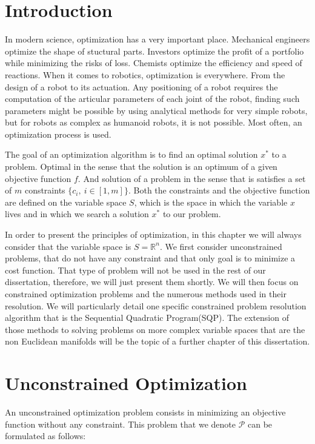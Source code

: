 \section{Introduction}
In modern science, optimization has a very important place.
Mechanical engineers optimize the shape of stuctural parts.
Investors optimize the profit of a portfolio while minimizing the risks of loss.
Chemists optimize the efficiency and speed of reactions.
When it comes to robotics, optimization is everywhere.
From the design of a robot to its actuation.
Any positioning of a robot requires the computation of the articular parameters of each joint of the robot, finding such parameters might be possible by using analytical methods for very simple robots, but for robots as complex as humanoid robots, it is not possible.
Most often, an optimization process is used.

The goal of an optimization algorithm is to find an optimal solution $x^*$ to a problem.
Optimal in the sense that the solution is an optimum of a given objective function $f$.
And solution of a problem in the sense that is satisfies a set of $m$ constraints $\{c_i,\ i\in [1,m]\}$.
Both the constraints and the objective function are defined on the variable space $\mathit{S}$, which is the space in which the variable $x$ lives and in which we search a solution $x^*$ to our problem.

In order to present the principles of optimization, in this chapter we will always consider that the variable space is $\mathit{S}=\mathbb{R}^n$.
We first consider unconstrained problems, that do not have any constraint and that only goal is to minimize a cost function.
That type of problem will not be used in the rest of our dissertation, therefore, we will just present them shortly.
We will then focus on constrained optimization problems and the numerous methods used in their resolution.
We will particularly detail one specific constrained problem resolution algorithm that is the Sequential Quadratic Program(SQP).
The extension of those methods to solving problems on more complex variable spaces that are the non Euclidean manifolds will be the topic of a further chapter of this dissertation.

\section{Unconstrained Optimization}

An unconstrained optimization problem consists in minimizing an objective function without any constraint.
This problem that we denote $\mathcal{P}$ can be formulated as follows:

